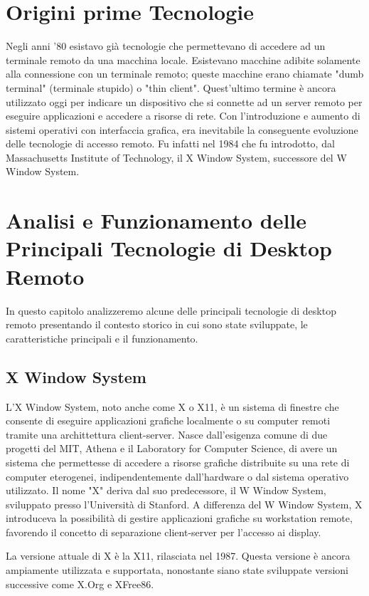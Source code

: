 \documentclass[12pt,a4paper,openright,twoside]{book}
\begin{document}
\section{Origini prime Tecnologie}
Negli anni '80 esistavo già tecnologie che permettevano di accedere ad un terminale remoto da una macchina locale. Esistevano macchine adibite solamente alla connessione con un terminale remoto; queste macchine erano chiamate "dumb terminal" (terminale stupido) o "thin client". Quest'ultimo termine è ancora utilizzato oggi per indicare un dispositivo che si connette ad un server remoto per eseguire applicazioni e accedere a risorse di rete.
Con l'introduzione e aumento di sistemi operativi con interfaccia grafica, era inevitabile la conseguente evoluzione delle tecnologie di accesso remoto. Fu infatti nel 1984 che fu introdotto, dal Massachusetts Institute of Technology, il X Window System, successore del W Window System.


\section{Analisi e Funzionamento delle Principali Tecnologie di Desktop Remoto}
In questo capitolo analizzeremo alcune delle principali tecnologie di desktop remoto presentando il contesto storico in cui sono state sviluppate, le caratteristiche principali e il funzionamento.

\subsection{X Window System}
L'X Window System, noto anche come X o X11, è un sistema di finestre che consente di eseguire applicazioni grafiche localmente o su computer remoti tramite una archittettura client-server.
Nasce dall'esigenza comune di due progetti del MIT, Athena e il Laboratory for Computer Science, di avere un sistema che permettesse di accedere a risorse grafiche distribuite su una rete di computer eterogenei, indipendentemente dall'hardware o dal sistema operativo utilizzato.
Il nome "X" deriva dal suo predecessore, il W Window System, sviluppato presso l'Università di Stanford. A differenza del W Window System, X introduceva la possibilità di gestire applicazioni grafiche su workstation remote, favorendo il concetto di separazione client-server per l'accesso ai display.

La versione attuale di X è la X11, rilasciata nel 1987. Questa versione è ancora ampiamente utilizzata e supportata, nonostante siano state sviluppate versioni successive come X.Org e XFree86.
\end{document}
